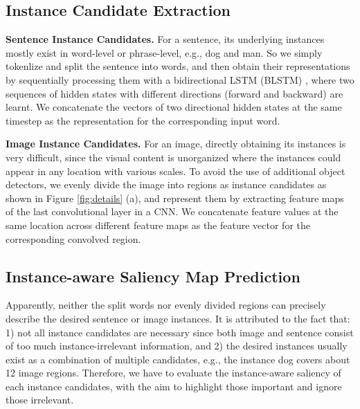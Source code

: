 \documentclass[10pt,twocolumn,letterpaper]{article}
\begin{document}
\subsection{Instance Candidate Extraction} \label{sect:candidates}


\textbf{Sentence Instance Candidates.}
For a sentence, its underlying instances mostly exist in word-level or phrase-level,
e.g., dog and man.
So we simply tokenlize and split the sentence into words,
and then obtain their representations by
sequentially processing them with a bidirectional LSTM (BLSTM) \cite{schuster1997bidirectional},
where two sequences of hidden states with different directions (forward and backward) are learnt.
We concatenate the vectors of two directional hidden states at the same timestep
as the representation for the corresponding input word.









\textbf{Image Instance Candidates.}
For an image, directly obtaining its instances is very difficult,
since the visual content is unorganized where the instances
could appear in any location with various scales.
To avoid the use of additional object detectors,
we evenly divide the image into regions as instance candidates
as shown in Figure \ref{fig:details} (a),
and represent them by extracting feature maps of the last convolutional layer in a CNN.
We concatenate feature values at the same location across different
feature maps as the feature vector for the corresponding convolved region.








\subsection{Instance-aware Saliency Map Prediction}








Apparently, neither the split words nor evenly divided
regions can precisely describe the desired sentence or image instances.
It is attributed to the fact that:
1) not all instance candidates are necessary since
both image and sentence consist of too much instance-irrelevant information,
and 2) the desired instances usually exist as a combination of
multiple candidates, e.g., the instance dog covers about 12 image regions.
Therefore, we have to evaluate the instance-aware saliency of each instance candidates,
with the aim to highlight those important and ignore those irrelevant.
\end{document}
